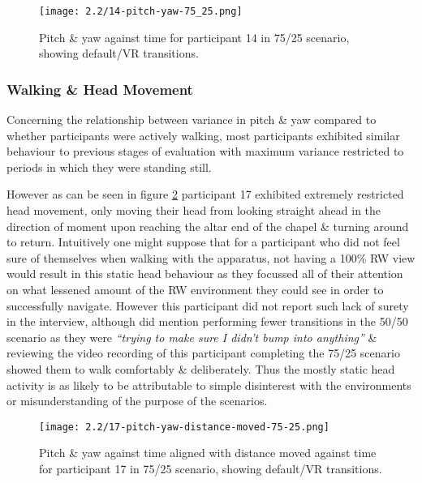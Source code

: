 \begin{figure}[h]
	\begin{center}
	\texttt{[image: 2.2/14-pitch-yaw-75\_25.png]}
	\caption{Pitch \& yaw against time for participant 14 in 75/25 scenario, showing default/VR transitions.}
	\label{14-pitch-yaw-75_25.png}
	\end{center}
\end{figure}


\subsubsection{Walking \& Head Movement}

Concerning the relationship between variance in pitch \& yaw compared to whether participants were actively walking, most participants exhibited similar behaviour to previous stages of evaluation with maximum variance restricted to periods in which they were standing still.

However as can be seen in figure \ref{17-pitch-yaw-distance-moved-75-25.png} participant 17 exhibited extremely restricted head movement, only moving their head from looking straight ahead in the direction of moment upon reaching the altar end of the chapel \& turning around to return. Intuitively one might suppose that for a participant who did not feel sure of themselves when walking with the apparatus, not having a 100\% RW view would result in this static head behaviour as they focussed all of their attention on what lessened amount of the RW environment they could see in order to successfully navigate. However this participant did not report such lack of surety in the interview, although did mention performing fewer transitions in the 50/50 scenario as they were \textit{``trying to make sure I didn't bump into anything''} \& reviewing the video recording of this participant completing the 75/25 scenario showed them to walk comfortably \& deliberately. Thus the mostly static head activity is as likely to be attributable to simple disinterest with the environments or misunderstanding of the purpose of the scenarios.

\begin{figure}[h]
	\begin{center}
	\texttt{[image: 2.2/17-pitch-yaw-distance-moved-75-25.png]}
	\caption{Pitch \& yaw against time aligned with distance moved against time for participant 17 in 75/25 scenario, showing default/VR transitions.}
	\label{17-pitch-yaw-distance-moved-75-25.png}
	\end{center}
\end{figure}

